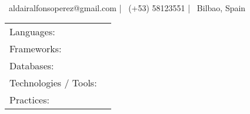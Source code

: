 \documentclass[]{awesome-cv}
\begin{document}
\begin{center}
	  \\
	\vspace{2mm}
	{\hspace{0.8cm}\faEnvelope\ aldairalfonsoperez@gmail.com}  |  {\faMobile\ (+53) 58123551}  |  {\faMapMarker\ Bilbao, Spain}
\end{center}

\begin{cventries}
	\cventry
	{}
	{\def\arraystretch{1.15}{\begin{tabular}{ l l }
				Languages:                            & {\skill{ C\# (Advanced), Python, C, C++, SQL, JavaScript.}}                       \\
				Frameworks:                           & {\skill{ .Net, ASP.NET, Django, FastAPI.}}                                        \\
				Databases:                            & {\skill{ MySQL, PostgreSQL, SQLite.}}                                             \\
				Technologies / Tools: \hspace{0.05cm} & {\skill{ Visual Studio, Unity Editor, Git, Docker, npm.}}                         \\
				Practices:                            & {\skill{ Agile, Scrum, SOLID Principles, Test-Driven Development, Code Reviews.}} \\
			\end{tabular}}}
	{}
	{}
	{}
\end{cventries}
\vspace{-7mm}
\end{document}
